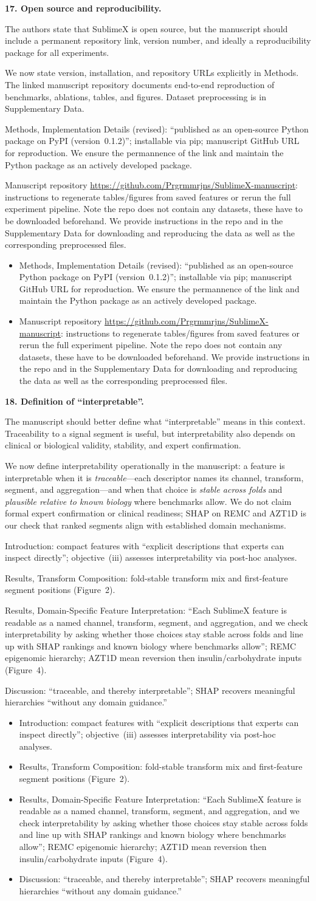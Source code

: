 \documentclass[11pt]{article}
\makeatletter
\newcommand{\rsp}{\par\vspace{0.9em}}
\newcommand{\rcitem}[2]{\begin{reviewerbox}\textbf{#1}\par\smallskip#2\end{reviewerbox}}
\newcommand{\response}[2]{%
  \begin{responsebox}#1%
  \def\@responseitems{#2}%
  \ifx\@responseitems\empty\else\begin{itemize}[nosep,leftmargin=1.2em]#2\end{itemize}\fi
  \end{responsebox}\rsp}
\makeatother
\begin{document}
\rcitem{17. Open source and reproducibility.}{The authors state that SublimeX is open source, but
the manuscript should include a permanent repository link, version number, and ideally a
reproducibility package for all experiments.}

\response{We now state version, installation, and repository URLs explicitly in Methods. The
linked manuscript repository documents end-to-end reproduction of benchmarks, ablations, tables,
and figures. Dataset preprocessing is in Supplementary Data.}{
  \item Methods, Implementation Details (revised): ``published as an open-source Python package on
    PyPI (version~0.1.2)''; installable via pip; manuscript GitHub URL for reproduction. 
    We ensure the permannence of the link and maintain the Python package as an actively developed package.
  \item Manuscript repository \url{https://github.com/Prgrmmrjns/SublimeX-manuscript}: 
  instructions to regenerate tables/figures from saved features or rerun the full experiment pipeline.
  Note the repo does not contain any datasets, these have to be downloaded beforehand. 
  We provide instructions in the repo and in the Supplementary Data for downloading and reproducing the data
  as well as the corresponding preprocessed files.
}

\rcitem{18. Definition of ``interpretable''.}{The manuscript should better define what
``interpretable'' means in this context. Traceability to a signal segment is useful, but
interpretability also depends on clinical or biological validity, stability, and expert
confirmation.}

\response{We now define interpretability operationally in the manuscript: a feature is
interpretable when it is \emph{traceable}---each descriptor names its channel, transform, segment,
and aggregation---and when that choice is \emph{stable across folds} and \emph{plausible relative to
known biology} where benchmarks allow. We do not claim formal expert confirmation or clinical
readiness; SHAP on REMC and AZT1D is our check that ranked segments align with established domain
mechanisms.}{
  \item Introduction: compact features with ``explicit descriptions that experts can inspect
    directly''; objective~(iii) assesses interpretability via post-hoc analyses.
  \item Results, Transform Composition: fold-stable transform mix and first-feature segment
    positions (Figure~2).
  \item Results, Domain-Specific Feature Interpretation: ``Each SublimeX feature is readable as a
    named channel, transform, segment, and aggregation, and we check interpretability by asking
    whether those choices stay stable across folds and line up with SHAP rankings and known
    biology where benchmarks allow''; REMC epigenomic hierarchy; AZT1D mean reversion then
    insulin/carbohydrate inputs (Figure~4).
  \item Discussion: ``traceable, and thereby interpretable''; SHAP recovers meaningful hierarchies
    ``without any domain guidance.''
}
\end{document}

